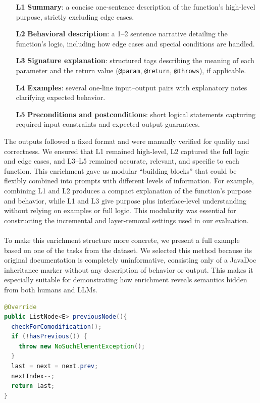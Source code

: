 \documentclass[a4paper]{usiinfbachelorproject}
\begin{document}
\begin{enumerate}[leftmargin=15pt]
  \item[\textbf{L1}] \textbf{Summary}: a concise one-sentence description of the function's high-level purpose, strictly excluding edge cases.
  \item[\textbf{L2}] \textbf{Behavioral description}: a 1--2 sentence narrative detailing the function’s logic, including how edge cases and special conditions are handled.
  \item[\textbf{L3}] \textbf{Signature explanation}: structured tags describing the meaning of each parameter and the return value (\texttt{@param}, \texttt{@return}, \texttt{@throws}), if applicable.
  \item[\textbf{L4}] \textbf{Examples}: several one-line input–output pairs with explanatory notes clarifying expected behavior.
  \item[\textbf{L5}] \textbf{Preconditions and postconditions}: short logical statements capturing required input constraints and expected output guarantees.
\end{enumerate}
The outputs followed a fixed format and were manually verified for quality and correctness. We ensured that L1 remained high-level, L2 captured the full logic and edge cases, and L3–L5 remained accurate, relevant, and specific to each function. This enrichment gave us modular “building blocks” that could be flexibly combined into prompts with different levels of information. For example, combining L1 and L2 produces a compact explanation of the function’s purpose and behavior, while L1 and L3 give purpose plus interface-level understanding without relying on examples or full logic. This modularity was essential for constructing the incremental and layer-removal settings used in our evaluation.\\
\\[2pt]
To make this enrichment structure more concrete, we present a full example based on one of the tasks from the dataset. We selected this method because its original documentation is completely uninformative, consisting only of a JavaDoc inheritance marker without any description of behavior or output. This makes it especially suitable for demonstrating how enrichment reveals semantics hidden from both humans and LLMs.

\clearpage
\begin{lstlisting}[language=Java, caption={Reference implementation of \texttt{previousNode}}, label={lst:previous}]
@Override 
public ListNode<E> previousNode(){
  checkForComodification();
  if (!hasPrevious()) {
    throw new NoSuchElementException();
  }
  last = next = next.prev;
  nextIndex--;
  return last;
}
\end{lstlisting}
\end{document}
